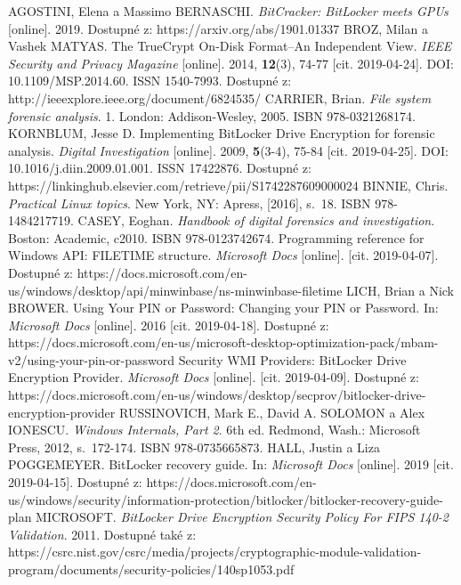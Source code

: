 \documentclass[a4paper,12pt]{article}
\begin{document}
{
AGOSTINI, Elena a Massimo BERNASCHI. \textit{BitCracker: BitLocker meets GPUs} [online]. 2019. Dostupné z: https://arxiv.org/abs/1901.01337
BROZ, Milan a Vashek MATYAS. The TrueCrypt On-Disk Format--An Independent View. \textit{IEEE Security and Privacy Magazine} [online]. 2014, \textbf{12}(3), 74-77 [cit. 2019-04-24]. DOI: 10.1109/MSP.2014.60. ISSN 1540-7993. Dostupné z: http://ieeexplore.ieee.org/document/6824535/
CARRIER, Brian. \textit{File system forensic analysis}. 1. London: Addison-Wesley, 2005. ISBN 978-0321268174.
KORNBLUM, Jesse D. Implementing BitLocker Drive Encryption for forensic analysis. \textit{Digital Investigation} [online]. 2009, \textbf{5}(3-4), 75-84 [cit. 2019-04-25]. DOI: 10.1016/j.diin.2009.01.001. ISSN 17422876. Dostupné z: https://linkinghub.elsevier.com/retrieve/pii/S1742287609000024
BINNIE, Chris. \textit{Practical Linux topics}. New York, NY: Apress, [2016], s.~18. ISBN 978-1484217719.
CASEY, Eoghan. \textit{Handbook of digital forensics and investigation}. Boston: Academic, c2010. ISBN 978-0123742674.
Programming reference for Windows API: FILETIME structure. \textit{Microsoft Docs} [online]. [cit. 2019-04-07]. Dostupné z: https://docs.microsoft.com/en-us/windows/desktop/api/minwinbase/ns-minwinbase-filetime
LICH, Brian a Nick BROWER. Using Your PIN or Password: Changing your PIN or Password. In: \textit{Microsoft Docs} [online]. 2016 [cit. 2019-04-18]. Dostupné z: https://docs.microsoft.com/en-us/microsoft-desktop-optimization-pack/mbam-v2/using-your-pin-or-password
Security WMI Providers: BitLocker Drive Encryption Provider. \textit{Microsoft Docs} [online]. [cit. 2019-04-09]. Dostupné z: https://docs.microsoft.com/en-us/windows/desktop/secprov/bitlocker-drive-encryption-provider
RUSSINOVICH, Mark E., David A. SOLOMON a Alex IONESCU. \textit{Windows Internals, Part 2}. 6th ed. Redmond, Wash.: Microsoft Press, 2012, s.~172-174. ISBN 978-0735665873.
HALL, Justin a Liza POGGEMEYER. BitLocker recovery guide. In: \textit{Microsoft Docs} [online]. 2019 [cit. 2019-04-15]. Dostupné z: https://docs.microsoft.com/en-us/windows/security/information-protection/bitlocker/bitlocker-recovery-guide-plan
MICROSOFT. \textit{BitLocker Drive Encryption Security Policy For FIPS 140-2 Validation}. 2011. Dostupné také z: https://csrc.nist.gov/csrc/media/projects/cryptographic-module-validation-program/documents/security-policies/140sp1053.pdf
}
\end{document}
